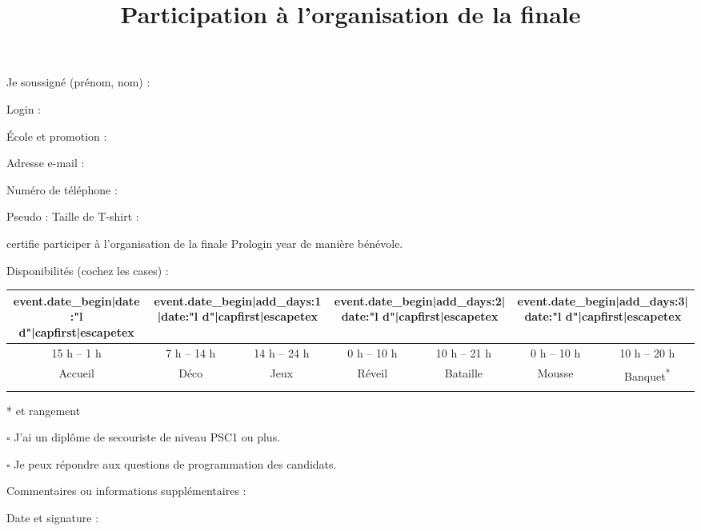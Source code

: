 \documentclass[a4paper,11pt]{prologin}
\title{Participation à l'organisation de la finale}
\begin{document}
{
Je soussigné (prénom, nom) : \hrulefill

Login : \hrulefill

École et promotion : \hrulefill

Adresse e-mail : \hrulefill

Numéro de téléphone : \hrulefill

Pseudo : \hrulefill \hspace{0.1cm}
Taille de T-shirt : \hrulefill

}

certifie participer à l'organisation de la finale Prologin {{ year }} de
manière bénévole.

Disponibilités (cochez les cases) :

\begin{center}
\begin{tabular}{|c|c|c|c|c|c|c|}

\hline
{{ event.date_begin|date:"l d"|capfirst|escapetex }} &
\multicolumn{2}{c|}{ {{ event.date_begin|add_days:1|date:"l d"|capfirst|escapetex }} } &
\multicolumn{2}{c|}{ {{ event.date_begin|add_days:2|date:"l d"|capfirst|escapetex }} } &
\multicolumn{2}{c|}{ {{ event.date_begin|add_days:3|date:"l d"|capfirst|escapetex }} }
\tabularnewline
\hline
15 h -- 1 h & 7 h -- 14 h & 14 h -- 24 h & 0 h -- 10 h & 10 h -- 21 h &
0 h -- 10 h & 10 h -- 20 h\tabularnewline
\hline
Accueil & Déco & Jeux & Réveil & Bataille & Mousse & Banquet\textsuperscript{*}\tabularnewline
\hline
&&&&&&\tabularnewline
\hline
\end{tabular}
\end{center}

* et rangement

{\Large$\square$} J'ai un diplôme de secouriste de niveau PSC1 ou plus.

{\Large$\square$} Je peux répondre aux questions de programmation des candidats.

\vspace{0.5cm}

Commentaires ou informations supplémentaires :

\vspace{3cm}

Date et signature :
\end{document}
